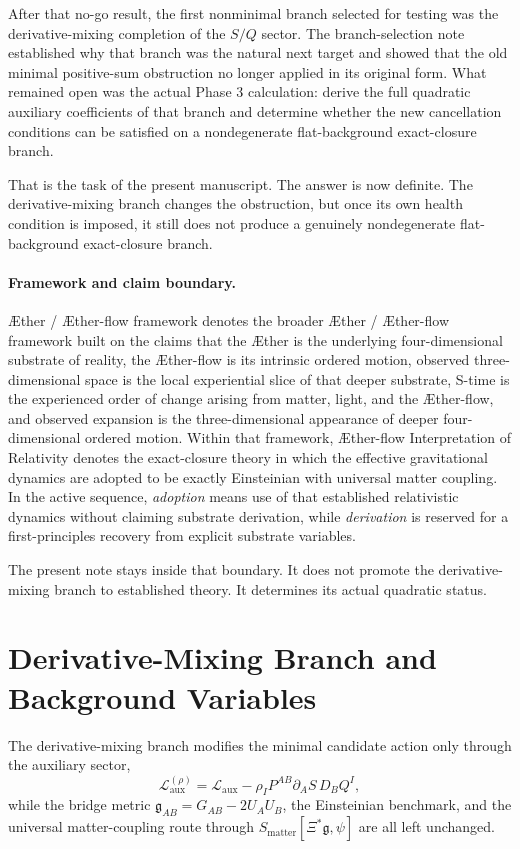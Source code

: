 \documentclass[11pt]{article}
\newcommand{\Aether}{\AE{}ther}
\newcommand{\Aflow}{\AE{}ther-flow}
\newcommand{\TheoryName}{\Aflow{} Interpretation of Relativity}
\newcommand{\TheoryProgram}{\Aether{} / \Aflow{} framework}
\newcommand{\BridgeMetric}{\mathfrak{g}}
\begin{document}
After that no-go result, the first nonminimal branch selected for testing was the derivative-mixing completion of the \(S/Q\) sector. The branch-selection note established why that branch was the natural next target and showed that the old minimal positive-sum obstruction no longer applied in its original form. What remained open was the actual Phase 3 calculation: derive the full quadratic auxiliary coefficients of that branch and determine whether the new cancellation conditions can be satisfied on a nondegenerate flat-background exact-closure branch.

That is the task of the present manuscript. The answer is now definite. The derivative-mixing branch changes the obstruction, but once its own health condition is imposed, it still does not produce a genuinely nondegenerate flat-background exact-closure branch.

\paragraph{Framework and claim boundary.}
\TheoryProgram{} denotes the broader \Aether{} / \Aflow{} framework built on the claims that the \Aether{} is the underlying four-dimensional substrate of reality, the \Aflow{} is its intrinsic ordered motion, observed three-dimensional space is the local experiential slice of that deeper substrate, S-time is the experienced order of change arising from matter, light, and the \Aflow{}, and observed expansion is the three-dimensional appearance of deeper four-dimensional ordered motion. Within that framework, \TheoryName{} denotes the exact-closure theory in which the effective gravitational dynamics are adopted to be exactly Einsteinian with universal matter coupling. In the active sequence, \emph{adoption} means use of that established relativistic dynamics without claiming substrate derivation, while \emph{derivation} is reserved for a first-principles recovery from explicit substrate variables.

The present note stays inside that boundary. It does not promote the derivative-mixing branch to established theory. It determines its actual quadratic status.

\section{Derivative-Mixing Branch and Background Variables}

The derivative-mixing branch modifies the minimal candidate action only through the auxiliary sector,
\begin{equation}
\mathcal L_{\mathrm{aux}}^{(\rho)}
=
\mathcal L_{\mathrm{aux}}
-\rho_I P^{AB}\partial_A S\,D_BQ^I,
\label{eq:Lauxrho}
\end{equation}
while the bridge metric \(\BridgeMetric_{AB}=G_{AB}-2U_AU_B\), the Einsteinian benchmark, and the universal matter-coupling route through \(S_{\mathrm{matter}}[\Xi^*\BridgeMetric,\psi]\) are all left unchanged.
\end{document}
